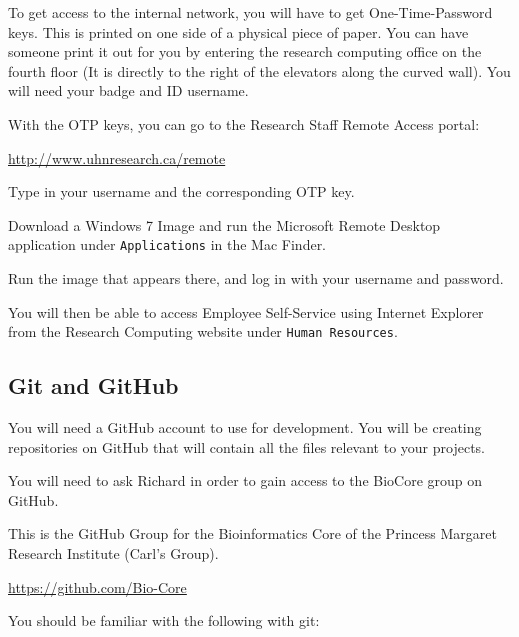 \documentclass{article}
\begin{document}
To get access to the internal network, you will have to get One-Time-Password
keys. This is printed on one side of a physical piece of paper.
You can have someone print it out for you by entering the research
computing office on the fourth floor (It is directly to the right of the elevators
along the curved wall). You will need your badge and ID username.

With the OTP keys, you can go to the Research Staff Remote Access portal:

\url{http://www.uhnresearch.ca/remote}

Type in your username and the corresponding OTP key.

Download a Windows 7 Image and run the Microsoft Remote Desktop
application under \texttt{Applications} in the Mac Finder. 

Run the image that appears there, and log in with your
username and password.

You will then be able to access Employee Self-Service
using Internet Explorer from the Research Computing website
under \texttt{Human Resources}.

\subsection{Git and GitHub}

You will need a GitHub account to use for development.
You will be creating repositories on GitHub that will
contain all the files relevant to your projects.

You will need to ask Richard in order to gain access to 
the BioCore group on GitHub.

This is the GitHub Group for the Bioinformatics Core
of the Princess Margaret Research Institute (Carl's Group).

\url{https://github.com/Bio-Core}

You should be familiar with the following with git:
\end{document}
